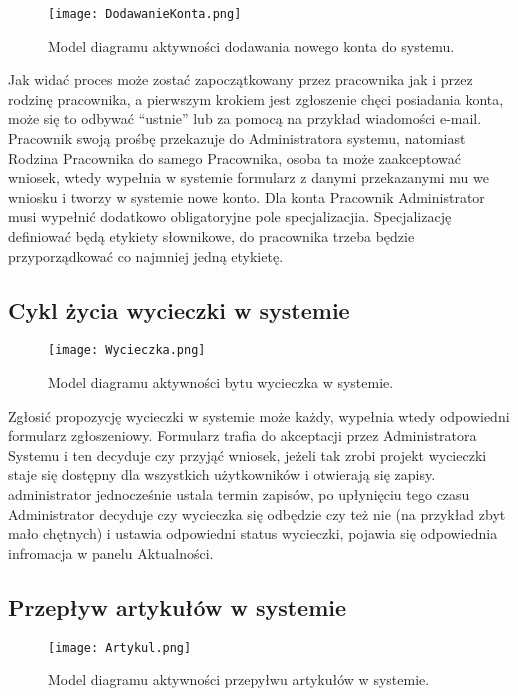 \begin{figure}[!h]
    \centering
    \texttt{[image: DodawanieKonta.png]}
    \caption{Model diagramu aktywności dodawania nowego konta do systemu.}
    \label{fig:dodawaniekonta}
\end{figure}

Jak widać proces może zostać zapoczątkowany przez pracownika jak i przez rodzinę pracownika, a pierwszym krokiem jest zgłoszenie chęci posiadania konta, może się to odbywać ``ustnie'' lub za pomocą na przykład wiadomości e-mail. Pracownik swoją prośbę przekazuje do Administratora systemu, natomiast Rodzina Pracownika do samego Pracownika, osoba ta może zaakceptować wniosek, wtedy wypełnia w systemie formularz z danymi przekazanymi mu we wniosku i tworzy w systemie nowe konto. Dla konta Pracownik Administrator musi wypełnić dodatkowo obligatoryjne pole specjalizacjia. Specjalizację definiować będą etykiety słownikowe, do pracownika trzeba będzie przyporządkować co najmniej jedną etykietę.

\subsection{Cykl życia wycieczki w systemie}

\begin{figure}[!tb]
    \centering
    \texttt{[image: Wycieczka.png]}
    \caption{Model diagramu aktywności bytu wycieczka w systemie.}
    \label{fig:wycieczka}
\end{figure}

Zgłosić propozycję wycieczki w systemie może każdy, wypełnia wtedy odpowiedni formularz zgłoszeniowy. Formularz trafia do akceptacji przez Administratora Systemu i ten decyduje czy przyjąć wniosek, jeżeli tak zrobi projekt wycieczki staje się dostępny dla wszystkich użytkowników i otwierają się zapisy. administrator jednocześnie ustala termin zapisów, po upłynięciu tego czasu Administrator decyduje czy wycieczka się odbędzie czy też nie (na przykład zbyt mało chętnych) i ustawia odpowiedni status wycieczki, pojawia się odpowiednia infromacja w panelu Aktualności.

\subsection{Przepływ artykułów w systemie}

\begin{figure}[!tb]
    \centering
    \texttt{[image: Artykul.png]}
    \caption{Model diagramu aktywności przepyłwu artykułów w systemie.}
    \label{fig:rodzina}
\end{figure}


